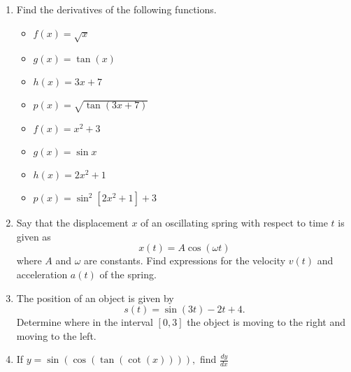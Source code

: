 \documentclass{article}
\begin{document}
\begin{enumerate}
\item  Find the derivatives of the following functions.
\begin{multicols}{2}
\begin{itemize}
\item $ f(x) = \sqrt{x}$
\item $ g(x) = \tan(x)$
\item $ h(x) = 3x + 7$
\item $ p(x) = \sqrt{\tan(3x+7)}$
\item $ f(x) = x^2 + 3$
\item $ g(x) = \sin{x}$
\item $ h(x) = 2x^2 +1$
\item $ p(x) = \sin^2[2x^2+1] + 3$
\end{itemize}
\end{multicols}
\item Say that the displacement $ x $ of an oscillating spring with respect to time $ t $ is given as
$$x(t) = A\cos(\omega t)$$
where  $ A $ and $ \omega $ are constants. Find expressions for the velocity $ v(t) $ and acceleration $ a(t) $ of the spring.

\item The position of an object is given by 
$$s(t)=\sin(3t)-2t+4.$$
Determine where in the interval $[0,3]$
 the object is moving to the right and moving to the left. 
\item If $y = \sin(\cos(\tan(\cot(x)))),$ find $\frac{dy}{dx}$
\end{enumerate}
\end{document}
